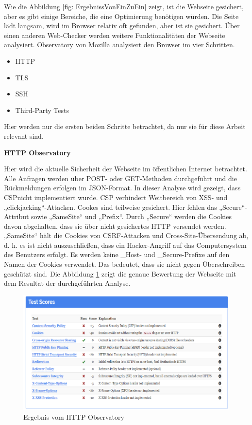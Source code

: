 Wie die Abbildung \ref{fig: ErgebnissVonEinZuEin} zeigt, ist die Webseite gesichert, aber es gibt einige Bereiche, die eine Optimierung benötigen würden. Die Seite lädt langsam, wird im Browser relativ oft gefunden, aber ist sie gesichert.
Über einen anderen Web-Checker werden weitere Funktionalitäten der Webseite analysiert. Observatory \cite{King2018} von Mozilla analysiert den Browser im vier Schritten.

\begin{itemize}	
	\item \ac{HTTP}
	\item \ac{TLS}
	\item \ac{SSH}
	\item Third-Party Tests
\end{itemize}

Hier werden nur die ersten beiden Schritte betrachtet, da nur sie für diese Arbeit relevant sind.

\pagebreak

\textbf{HTTP Observatory}

Hier wird die aktuelle Sicherheit der Webseite im öffentlichen Internet betrachtet. Alle Anfragen werden über POST- oder GET-Methoden durchgeführt und die Rückmeldungen erfolgen im JSON-Format. In dieser Analyse wird gezeigt, dass \ac{CSP}nicht implementiert wurde. CSP verhindert Weitbereich von \ac{XSS}- und „clickjacking“-Attacken. Cookes sind teilweise gesichert. Hier fehlen das „Secure“-Attribut sowie „SameSite“ und „Prefix“. Durch „Secure“ werden die Cookies davon abgehalten, dass sie über nicht gesichertes HTTP versendet werden. „SameSite“ hält die Cookies von \ac{CSRF}-Attacken und Cross-Site-Übersendung ab, d. h. es ist nicht auszuschließen, dass ein Hacker-Angriff auf das Computersystem des Benutzers erfolgt. Es werden keine \_Host- und \_Secure-Prefixe auf den Namen der Cookies verwendet. Das bedeutet, dass sie nicht gegen Überschreiben geschützt sind. Die Abbildung \ref{fig: HTTP Observatory: Ergebnis} zeigt die genaue Bewertung der Webseite mit dem Resultat der durchgeführten Analyse.
 
\begin{figure}[h]
	\centering
	\includegraphics[width=0.7\linewidth]{Graphics/eergebnisobser.png}
	\caption[Egebniss vom HTTP Observatory]{ Ergebnis vom HTTP Observatory }
	\label{fig: HTTP Observatory: Ergebnis}
\end{figure}

